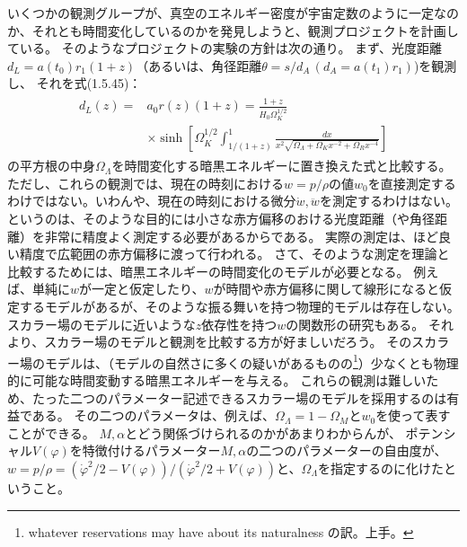 \documentclass[11pt]{ltjsarticle}
\theoremstyle{plain}
\theoremstyle{break}
\begin{document}
いくつかの観測グループが、真空のエネルギー密度が宇宙定数のように一定なのか、それとも時間変化しているのかを発見しようと、観測プロジェクトを計画している。
そのようなプロジェクトの実験の方針は次の通り。
まず、光度距離$d_{L}=a\left(t_{0}\right) r_{1}(1+z)$（あるいは、角径距離$\theta=s / d_{A} \,(d_{A}=a\left(t_{1}\right) r_{1})$)を観測し、
それを式(1.5.45)：
\begin{align}
  \begin{aligned} d_{L}(z)=& a_{0} r(z)(1+z)=\frac{1+z}{H_{0} \Omega_{K}^{1 / 2}} \\ & \times \sinh \left[\Omega_{K}^{1 / 2} \int_{1 /(1+z)}^{1} \frac{d x}{x^{2} \sqrt{\Omega_{\Lambda}+\Omega_{K} x^{-2}+\Omega_{R} x^{-4}}}\right] \end{aligned}
\end{align}%
の平方根の中身$\Omega_\Lambda$を時間変化する暗黒エネルギーに置き換えた式と比較する。
ただし、これらの観測では、現在の時刻における$w = p/\rho$の値$w_0$を直接測定するわけではない。いわんや、現在の時刻における微分$\dot{w},\ddot{w}$を測定するわけはない。
というのは、そのような目的には小さな赤方偏移のおける光度距離（や角径距離）を非常に精度よく測定する必要があるからである。
実際の測定は、ほど良い精度で広範囲の赤方偏移に渡って行われる。
さて、そのような測定を理論と比較するためには、暗黒エネルギーの時間変化のモデルが必要となる。
例えば、単純に$w$が一定と仮定したり、$w$が時間や赤方偏移に関して線形になると仮定するモデルがあるが、そのような振る舞いを持つ物理的モデルは存在しない。
スカラー場のモデルに近いような$z$依存性を持つ$w$の関数形の研究もある。
それより、スカラー場のモデルと観測を比較する方が好ましいだろう。
そのスカラー場のモデルは、（モデルの自然さに多くの疑いがあるものの\footnote{whatever reservations may have about its naturalness の訳。上手。}）少なくとも物理的に可能な時間変動する暗黒エネルギーを与える。
これらの観測は難しいため、たった二つのパラメーター記述できるスカラー場のモデルを採用するのは有益である。
その二つのパラメータは、例えば、$\Omega_{\Lambda} = 1- \Omega_{M}$と$w_0$を使って表すことができる。
$M,\alpha$とどう関係づけられるのかがあまりわからんが、
ポテンシャル$V(\varphi)$を特徴付けるパラメーター$M,\alpha$の二つのパラメーターの自由度が、$w = p/\rho=({\dot{\varphi}^2/2 - V(\varphi)})/({\dot{\varphi}^2/2 + V(\varphi)})$と、$\Omega_\Lambda $を指定するのに化けたということ。
\end{document}
